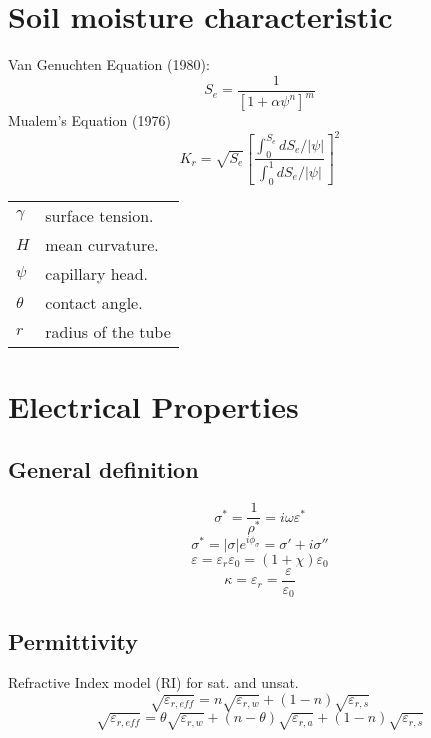 \documentclass[twocolumn]{article}
\begin{document}
\section{Soil moisture characteristic}
Van Genuchten Equation (1980):
\[ S_e = \frac{1}{\left[ 1 + \alpha \psi^n \right]^m}\]
Mualem's Equation (1976)
\[ K_r= \sqrt{S_e} \left[ \frac{\int_0^{S_e}{dS_e / |\psi|}}{\int_0^1{dS_e/|\psi|}} \right] ^2 \]
\begin{tabular}{@{}ll@{}}
$\gamma$  & surface tension. \\
$H$ & mean curvature.\\
$\psi$ & capillary head.\\
$\theta$ & contact angle.\\
$r$ & radius of the tube
\end{tabular}


\section{Electrical Properties}

\subsection{General definition}
\[ \sigma^* = \frac{1}{\rho^*}=i \omega \varepsilon^* \]
\[ \sigma^* = |\sigma|e^{i\phi_\sigma} =\sigma' +i\sigma''\]
\[ \varepsilon = \varepsilon_r\varepsilon_0=(1+\chi)\varepsilon_0\]
\[ \kappa=\varepsilon_r=\frac{\varepsilon}{\varepsilon_0}\]

\subsection{Permittivity}
Refractive Index model (RI) for sat. and unsat.
\[ \sqrt{\varepsilon_{r,eff}} =n\sqrt{\varepsilon_{r,w}} +(1-n)\sqrt{\varepsilon_{r,s}}\] 
\[ \sqrt{\varepsilon_{r,eff}} =\theta\sqrt{\varepsilon_{r,w}} +(n-\theta)\sqrt{\varepsilon_{r,a}}+(1-n)\sqrt{\varepsilon_{r,s}}\]
 
\end{document}
